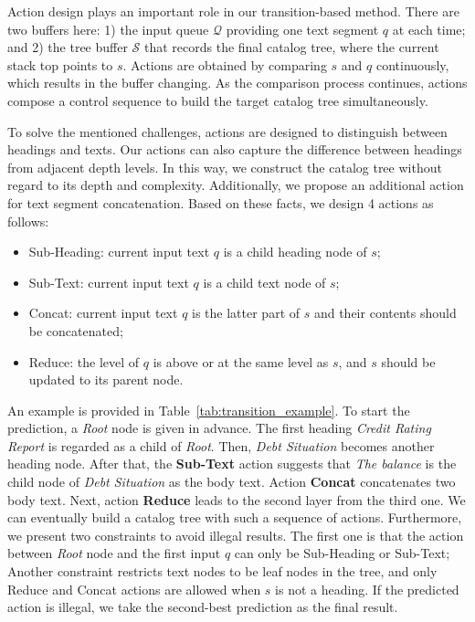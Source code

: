 \documentclass[runningheads]{llncs}
\begin{document}
Action design plays an important role in our transition-based method.
There are two buffers here: 1) the input queue $\mathcal{Q}$ providing one text segment $q$ at each time; and 2) the tree buffer $\mathcal{S}$ that records the final catalog tree, where the current stack top points to $s$.
Actions are obtained by comparing $s$ and $q$ continuously, which results in the buffer changing.
As the comparison process continues, actions compose a control sequence to build the target catalog tree simultaneously.

To solve the mentioned challenges, actions are designed to distinguish between headings and texts. Our actions can also capture the difference between headings from adjacent depth levels. In this way, we construct the catalog tree without regard to its depth and complexity. Additionally, we propose an additional action for text segment concatenation.
Based on these facts, we design 4 actions as follows:
\begin{itemize}
    \item Sub-Heading: current input text $q$ is a child heading node of $s$;
    \item Sub-Text: current input text $q$ is a child text node of $s$;
    \item Concat: current input text $q$ is the latter part of $s$ and their contents should be concatenated;
    \item Reduce: the level of $q$ is above or at the same level as $s$, and $s$ should be updated to its parent node.
\end{itemize}

An example is provided in Table~\ref{tab:transition_example}.
To start the prediction, a \textit{Root} node is given in advance.
The first heading \textit{Credit Rating Report} is regarded as a child of \textit{Root}. Then, \textit{Debt Situation} becomes another heading node. After that, the \textbf{Sub-Text} action suggests that \textit{The balance} is the child node of \textit{Debt Situation} as the body text. Action \textbf{Concat} concatenates two body text. Next, action \textbf{Reduce} leads to the second layer from the third one. We can eventually build a catalog tree with such a sequence of actions.
Furthermore, we present two constraints to avoid illegal results.
The first one is that the action between \textit{Root} node and the first input $q$ can only be Sub-Heading or Sub-Text; Another constraint restricts text nodes to be leaf nodes in the tree, and only Reduce and Concat actions are allowed when $s$ is not a heading.
If the predicted action is illegal, we take the second-best prediction as the final result.
\end{document}
